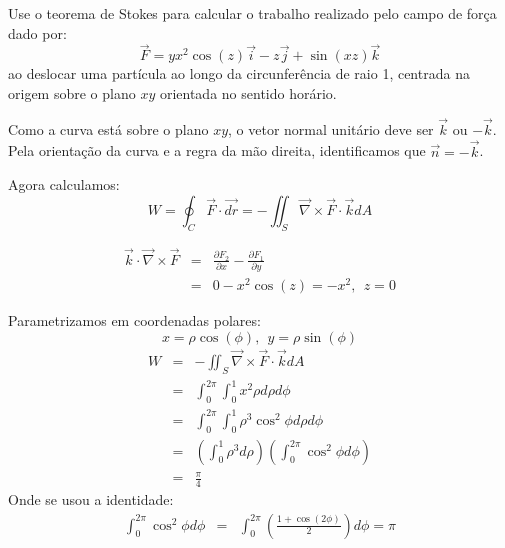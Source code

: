 \begin{exeresol}Use o teorema de Stokes para calcular o trabalho realizado pelo campo de força dado por:
   $$\vec{F}=yx^2\cos(z)\vec{i}-z\vec{j}+\sin(xz)\vec{k}$$ 
   ao deslocar uma partícula ao longo da circunferência de raio 1, centrada na origem sobre o plano $xy$ orientada no sentido horário.
\end{exeresol}
   \begin{resol}
      Como a curva está sobre o plano $xy$, o vetor normal unitário deve ser $\vec{k}$ ou $-\vec{k}$. Pela orientação da curva e a regra da mão direita, identificamos que $\vec{n}=-\vec{k}$.
      
      Agora calculamos:
      $$W=\oint_C \vec{F}\cdot \vec{dr} = -\iint_S \vec{\nabla}\times\vec{F}\cdot \vec{k} dA$$
      
      \begin{eqnarray*}
       \vec{k}\cdot\vec{\nabla}\times\vec{F}&=&\frac{\partial F_2}{\partial x}-\frac{\partial F_1}{\partial y}\\
       &=&0-x^2\cos(z)=-x^2,~~z=0
      \end{eqnarray*}
      
      Parametrizamos em coordenadas polares:
      $$x=\rho \cos(\phi),~~ y=\rho \sin(\phi)$$
      \begin{eqnarray*}
      W&=&-\iint_S \vec{\nabla}\times\vec{F}\cdot \vec{k} dA\\
      &=& \int_0^{2\pi}\int_0^1 x^2 \rho d\rho d\phi\\
      &=&\int_0^{2\pi}\int_0^1  \rho^3\cos^2\phi d\rho d\phi\\
      &=&\left(\int_0^1 \rho^3d\rho\right)\left(\int_0^{2\pi}\cos^2 \phi d\phi\right)\\
      &=&\frac{\pi}{4}
      \end{eqnarray*}
      Onde se usou a identidade:
      \begin{eqnarray*}
         \int_0^{2\pi}\cos^2 \phi d\phi
         &=& \int_0^{2\pi}\left(\frac{1+\cos(2\phi)}{2}\right)  d\phi = {\pi}
         \end{eqnarray*}


   \end{resol}

